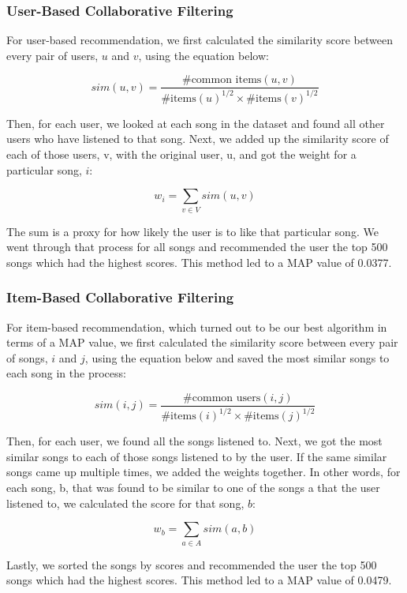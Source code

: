 \documentclass[12pt,preprint]{aastex}
\begin{document}
\subsubsection{User-Based Collaborative Filtering}
For user-based recommendation, we first calculated the similarity score between every pair of users, $u$ and $v$, using the equation below:

\begin{equation}
sim(u,v) = \frac{\text{\# common items}(u, v)}{{\text{\# items}(u)}^{1/2} \times {\text{\# items}(v)}^{1/2}}
\end{equation}

Then, for each user, we looked at each song in the dataset and found all other users who have listened to that song. Next, we added up the similarity score of each of those users, v, with the original user, u, and got the weight for a particular song, $i$:  

$$w_i = \sum_{v \in V} sim(u, v)$$

The sum is a proxy for how likely the user is to like that particular song. We went through that process for all songs and recommended the user the top 500 songs which had the highest scores. This method led to a MAP value of 0.0377.

\subsubsection{Item-Based Collaborative Filtering}
For item-based recommendation, which turned out to be our best algorithm in terms of a MAP value, we first calculated the similarity score between every pair of songs, $i$ and $j$, using the equation below and saved the most similar songs to each song in the process:

\begin{equation}
sim(i,j) = \frac{\text{\# common users}(i, j)}{{\text{\# items}(i)}^{1/2} \times {\text{\# items}(j)}^{1/2}}
\end{equation}

Then, for each user, we found all the songs listened to. Next, we got the most similar songs to each of those songs listened to by the user. If the same similar songs came up multiple times, we added the weights together. In other words, for each song, b, that was found to be similar to one of the songs a that the user listened to, we calculated the score for that song, $b$:

$$w_b = \sum_{a \in A} sim(a, b)$$

Lastly, we sorted the songs by scores and recommended the user the top 500 songs which had the highest scores. This method led to a MAP value of 0.0479.
\end{document}
